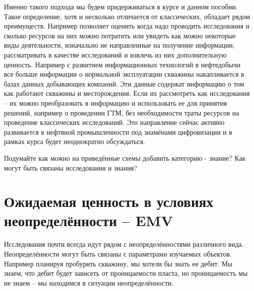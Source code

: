 Именно такого подхода мы будем придерживаться в курсе и данном пособии. Такое определение, хотя и несколько отличается от классических, обладает рядом преимуществ. Например позволяет оценить когда надо проводить исследования и сколько ресурсов на них можно потратить или увидеть как можно некоторые виды деятельности, изначально не направленные на получение информации, рассматривать в качестве исследований и извлечь из них дополнительную ценность.
Например с развитием информационных технологий в нефтедобычи все больше информации о нормальной эксплуатации скважины накапливается в базах данных добывающих компаний. Эти данные содержат информацию о том как работают скважины и месторождения. Если их рассмотреть как исследования -- их можно преобразовать в информацию и использовать ее для принятия решений, например о проведении ГТМ, без необходимости траты ресурсов на проведение классических исследований. Это направление сейчас активно развивается в нефтяной промышленности под знамёнами цифровизации и в рамках курса будет неоднократно обсуждаться.

Подумайте как можно на приведённые схемы добавить категорию - знание? Как могут быть связаны исследования и знания?

\section{Ожидаемая ценность в условиях неопределённости -- EMV}

Исследования почти всегда идут рядом с неопределённостями различного вида. Неопределённости могут быть связаны с параметрами изучаемых объектов. Например планируя пробурить скважину, мы хотели бы знать ее дебит. Мы знаем, что дебит будет зависеть от проницаемости пласта, но проницаемость мы не знаем -- мы находимся в ситуации неопределённости. 

